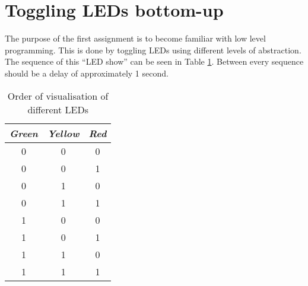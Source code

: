 \section{Toggling LEDs bottom-up}

The purpose of the first assignment is to become familiar with low level programming.
This is done by toggling LEDs using different levels of abstraction.
The sequence of this \enquote{LED show} can be seen in Table \ref{tab:led_scheme}.
Between every sequence should be a delay of approximately 1 second.

\begin{table}[H]
    \centering
    \begin{tabular}{|c|c|c|}
        \hline
        \textcolor{darkpink}{\textit{Green}} & \textcolor{darkpink}{\textit{Yellow}} & \textcolor{darkpink}{\textit{Red}}\\
        \hline
        0 & 0 & 0 \\
        \hline
        0 & 0 & 1 \\
        \hline
        0 & 1 & 0 \\
        \hline
        0 & 1 & 1 \\
        \hline
        1 & 0 & 0 \\
        \hline
        1 & 0 & 1 \\
        \hline
        1 & 1 & 0 \\
        \hline
        1 & 1 & 1 \\
        \hline
    \end{tabular}
        
    \label{tab:led_scheme}
    \caption{Order of visualisation of different LEDs}
\end{table}
